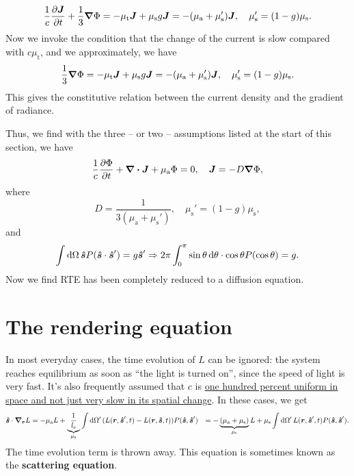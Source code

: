 \documentclass[hyperref, a4paper]{article}
\newcommand*{\concept}[1]{{\textbf{#1}}}
\def\\{}%
\begin{document}
\begin{equation}
    \frac{1}{c} \pdv{\vb*{J}}{t} + \frac{1}{3} \grad{\Phi}
    = - \mu_{\text{t}} \vb*{J} 
    + \mu_{\text{s}} g \vb*{J}
    = - (\mu_{\text{a}} + \mu_{\text{s}}') \vb*{J}, 
    \quad \mu_{\text{s}}' = (1 - g) \mu_{\text{s}}.
\end{equation}
Now we invoke the condition that the change of the current is slow 
compared with $c \mu_{\text{t}}$, 
and we approximately, we have 
\begin{equation}
    \frac{1}{3} \grad{\Phi}
    = - \mu_{\text{t}} \vb*{J} 
    + \mu_{\text{s}} g \vb*{J}
    = - (\mu_{\text{a}} + \mu_{\text{s}}') \vb*{J}, 
    \quad \mu_{\text{s}}' = (1 - g) \mu_{\text{s}}.
\end{equation}
This gives the constitutive relation between the current density 
and the gradient of radiance. 

Thus, we find with the three -- or two -- assumptions listed at the start of this section, 
we have 
\begin{equation}
    \frac{1}{c} \pdv{\Phi}{t} + \div{\vb*{J}} + \mu_{\text{a}} \Phi = 0, \quad 
    \vb*{J} = - D \grad{\Phi},
\end{equation}
where 
\begin{equation}
    D = \frac{1}{3 (\mu_{\text{a}} + \mu_{\text{s}}')}, \quad 
    \mu_{\text{s}}' = (1 - g) \mu_{\text{s}}, 
\end{equation}
and 
\begin{equation}
    \int \dd{\Omega} \vu*{s} P(\vu*{s} \cdot \vu*{s}') = g \vu*{s}'
    \Rightarrow 2 \pi \int_{0}^{\pi} \sin \theta \dd{\theta} \cdot \cos \theta P(\cos \theta)
    = g .
\end{equation}
Now we find RTE has been completely reduced to a diffusion equation.

\section{The rendering equation}

In most everyday cases, the time evolution of $L$ can be ignored: 
the system reaches equilibrium as soon as ``the light is turned on'', 
since the speed of light is very fast. 
It's also frequently assumed that $c$ is 
\ul{one hundred percent uniform in space
and not just very slow in its spatial change}. 
In these cases, we get 
\begin{equation}
    \begin{aligned}
        \vu*{s} \cdot \grad_{\vb*{r}} L &= 
        - \mu_{\text{a}} L +
        \underbrace{\frac{1}{l_{\text{s}}}}_{\mu_{\text{s}}} \int \dd{\Omega'} 
        (L(\vb*{r}, \vu*{s}', t) - L(\vb*{r}, \vu*{s}, t)) P(\vu*{s}, \vu*{s}') \\
        &= - \underbrace{(\mu_{\text{a}} + \mu_{\text{s}})}_{\mu_{\text{t}}} L 
        + \mu_{\text{s}} \int \dd{\Omega'} 
        L(\vb*{r}, \vu*{s}', t) P(\vu*{s}, \vu*{s}') .
    \end{aligned}
    \label{eq:se-final}
\end{equation}
The time evolution term is thrown away. 
This equation is sometimes known as the \concept{scattering equation}.
\end{document}
